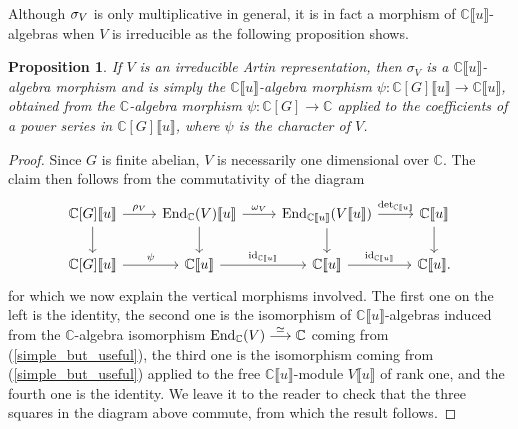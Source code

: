 \documentclass[11pt]{amsart}
\newtheorem{proposition}[theorem]{Proposition}
\numberwithin{equation}{section}
\theoremstyle{remark}
\theoremstyle{definition}
\begin{document}
Although ${\rm \sigma}_{V}$ is only multiplicative in general, it is in fact a morphism of $\mathbb{C}\llbracket u \rrbracket$-algebras when $V$ is irreducible as the following proposition shows.
\begin{proposition} \label{sigma_irr}
If $V$ is an irreducible Artin representation, then ${\sigma}_{V}$ is a $\mathbb{C}\llbracket u \rrbracket$-algebra morphism and is simply the $\mathbb{C}\llbracket u \rrbracket$-algebra morphism $\psi:\mathbb{C}[G]\llbracket u \rrbracket \rightarrow \mathbb{C}\llbracket u \rrbracket$, obtained from the $\mathbb{C}$-algebra morphism $\psi:\mathbb{C}[G] \rightarrow \mathbb{C}$ applied to the coefficients of a power series in $\mathbb{C}[G]\llbracket u \rrbracket$, where $\psi$ is the character of $V$.
\end{proposition}
\begin{proof}
Since $G$ is finite abelian, $V$ is necessarily one dimensional over $\mathbb{C}$.  The claim then follows from the commutativity of the diagram
\begin{equation*}
\begin{tikzcd}
\mathbb{C}[G]\llbracket u \rrbracket \arrow[d] \arrow["\rho_{V}",r] & {\rm End}_{\mathbb{C}}(V) \llbracket u \rrbracket \arrow[d] \arrow["\omega_{V}",r] & {\rm End}_{\mathbb{C}\llbracket u \rrbracket}(V\llbracket u \rrbracket) \arrow[d] \arrow["{\rm det}_{\mathbb{C}\llbracket u \rrbracket}",r] & \mathbb{C}\llbracket u \rrbracket \arrow[d]\\
\mathbb{C}[G]\llbracket u \rrbracket \arrow["\psi",r] & \mathbb{C}\llbracket u \rrbracket \arrow["{\rm id}_{\mathbb{C}\llbracket u \rrbracket}",r] & \mathbb{C}\llbracket u \rrbracket \arrow["{\rm id}_{\mathbb{C}\llbracket u \rrbracket}",r] & \mathbb{C}\llbracket u \rrbracket.
\end{tikzcd}
\end{equation*}
for which we now explain the vertical morphisms involved.  The first one on the left is the identity, the second one is the isomorphism of $\mathbb{C}\llbracket u \rrbracket$-algebras induced from the $\mathbb{C}$-algebra isomorphism ${\rm End}_{\mathbb{C}}(V) \stackrel{\simeq}{\longrightarrow} \mathbb{C}$ coming from (\ref{simple_but_useful}), the third one is the isomorphism coming from (\ref{simple_but_useful}) applied to the free $\mathbb{C}\llbracket u \rrbracket$-module $V\llbracket u \rrbracket$ of rank one, and the fourth one is the identity.  We leave it to the reader to check that the three squares in the diagram above commute, from which the result follows.
\end{proof}
\end{document}
